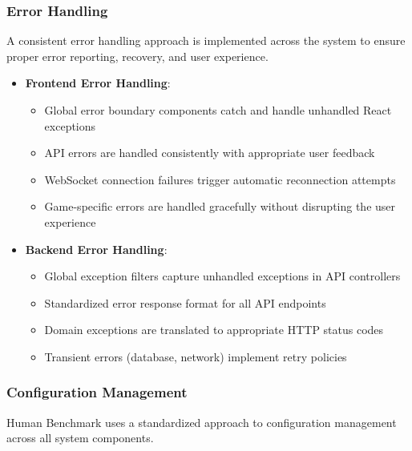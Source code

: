 \subsubsection{Error Handling}

A consistent error handling approach is implemented across the system to ensure proper error reporting, recovery, and user experience.

\begin{itemize}
    \item \textbf{Frontend Error Handling}:
    \begin{itemize}
        \item Global error boundary components catch and handle unhandled React exceptions
        \item API errors are handled consistently with appropriate user feedback
        \item WebSocket connection failures trigger automatic reconnection attempts
        \item Game-specific errors are handled gracefully without disrupting the user experience
    \end{itemize}
    
    \item \textbf{Backend Error Handling}:
    \begin{itemize}
        \item Global exception filters capture unhandled exceptions in API controllers
        \item Standardized error response format for all API endpoints
        \item Domain exceptions are translated to appropriate HTTP status codes
        \item Transient errors (database, network) implement retry policies
    \end{itemize}
\end{itemize}

\subsubsection{Configuration Management}

Human Benchmark uses a standardized approach to configuration management across all system components.

